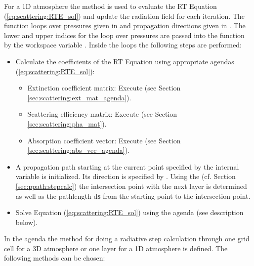 For a 1D atmosphere the method   is used to
evaluate the RT Equation (\ref{eq:scattering:RTE_sol}) and update the
radiation field  for each iteration. 
The function loops over pressures given in  and
propagation directions given in .  
The lower and upper indices for the loop over pressures are passed
into the function by the workspace variable
. Inside the loops the following steps are
performed:
\begin{itemize}
\item Calculate the coefficients of the RT Equation using appropriate agendas 
  (\ref{eq:scattering:RTE_sol}):
  \begin{itemize}
  \item Extinction coefficient matrix: Execute  (see
    Section \ref{sec:scattering:ext_mat_agenda}).
  \item Scattering efficiency matrix: Execute  (see
    Section \ref{sec:scattering:pha_mat}).
  \item Absorption coefficient vector:  Execute  (see
    Section \ref{sec:scattering:abs_vec_agenda}).
  \end{itemize}
\item A  propagation path starting at the current point specified by
  the internal variable  is initialized. Its
  direction is specified by . Using the
   (cf. Section
  \ref{sec:ppath:stepcalc}) 
  the intersection point with the next
  layer is determined as well as the pathlength d{\bf s} from the starting
  point to the intersection point.  
\item Solve Equation (\ref{eq:scattering:RTE_sol}) using  the agenda
   (see description below).
\end{itemize}

In the agenda  the method for doing a
radiative step calculation through one grid cell for a 3D atmosphere
or one layer for a 1D atmosphere is defined. The following methods can
be chosen:

